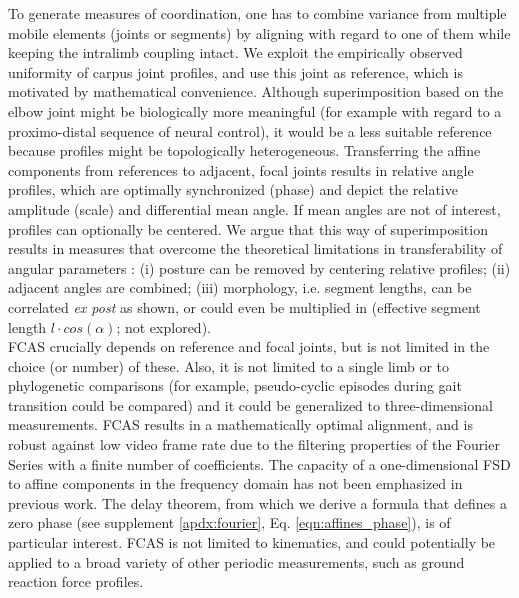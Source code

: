 To generate measures of coordination, one has to combine variance from multiple mobile elements (joints or segments) by aligning with regard to one of them while keeping the intralimb coupling intact.
We exploit the empirically observed uniformity of carpus joint profiles, and use this joint as reference, which is motivated by mathematical convenience.
Although superimposition based on the elbow joint might be biologically more meaningful (for example with regard to a proximo-distal sequence of neural control), it would be a less suitable reference because profiles might be topologically heterogeneous.
Transferring the affine components from references to adjacent, focal joints results in relative  angle profiles, which are optimally synchronized (phase) and depict the relative amplitude (scale) and differential mean  angle.
If mean  angles are not of interest, profiles can optionally be centered.
We argue that this way of superimposition results in measures that overcome the theoretical limitations in transferability of angular parameters \citep{Gatesy2011}: (i) posture can be removed by centering relative profiles; (ii) adjacent  angles are combined; (iii) morphology, i.e. segment lengths, can be correlated \textit{ex post} as shown, or could even be multiplied in (effective segment length $l\cdot cos\left(\alpha\right)$; not explored).
\\FCAS crucially depends on reference and focal joints, but is not limited in the choice (or number) of these.
Also, it is not limited to a single limb or to phylogenetic comparisons (for example, pseudo-cyclic episodes during gait transition could be compared) and it could be generalized to three-dimensional measurements.
FCAS results in a mathematically optimal alignment, and is robust against low video frame rate due to the filtering properties of the Fourier Series with a finite number of coefficients.
The capacity of a one-dimensional FSD to  affine components in the frequency domain has not been emphasized in previous work.
The delay theorem, from which we derive a formula that defines a zero phase (see supplement \ref*{apdx:fourier}, Eq. \ref*{eqn:affines_phase}), is of particular interest.
FCAS is not limited to kinematics, and could potentially be applied to a broad variety of other periodic measurements, such as ground reaction force profiles.



